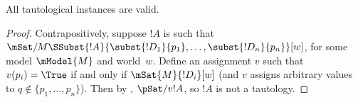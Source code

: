 \documentclass[../../../include/open-logic-section]{subfiles}
\begin{document}
\begin{thm}
  All tautological instances are valid.
\end{thm}

\begin{proof}
  Contrapositively, suppose $!A$ is such that
  $\mSat/{M}{\SSubst{!A}{\subst{!D_1}{p_1}, \dots,
      \subst{!D_n}{p_n}}}[w]$, for some model $\mModel{M}$ and
  world~$w$. Define an assignment $v$ such that $v(p_i) = \True$ if and
  only if $\mSat{M}{!D_i}[w]$ (and $v$ assigns arbitrary values to $q
  \notin \{p_1, \dots, p_n \}$).  Then by ,
  $\pSat/{v}{!A}$, so $!A$ is not a tautology.
\end{proof}
\end{document}
